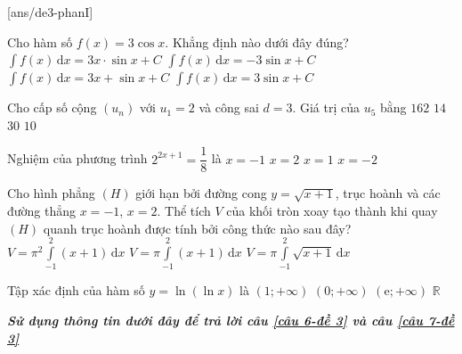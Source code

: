 \begin{name}
	{\tenchude}
	{\tendethi}
	{\tentruong}
	{\thoigian}
	\end{name}
\TN
{}[ans/de3-phanI]
\begin{ex}%
	Cho hàm số $f(x)=3\cos x$. Khẳng định nào dưới đây đúng?
	\choice
	{$\displaystyle\int f(x) \mathrm{\,d}x=3x\cdot\sin x+C$}
	{$\displaystyle\int f(x) \mathrm{\,d}x=-3\sin x+C$}
	{$\displaystyle\int f(x) \mathrm{\,d}x=3x+\sin x+C$}
	{\True $\displaystyle\int f(x) \mathrm{\,d}x=3\sin x+C$}
\end{ex}
\begin{ex}%
	Cho cấp số cộng $(u_n)$ với $u_1=2$ và công sai $d=3$. Giá trị của $u_5$ bằng
	\choice
	{$162$}
	{\True $14$}
	{$30$}
	{$10$}
\end{ex}
\begin{ex}%
	Nghiệm của phương trình $2^{2x+1}=\dfrac{1}{8}$ là
	\choice
	{$x=-1$}
	{$x=2$}
	{$x=1$}
	{\True $x=-2$}
\end{ex}
\begin{ex}%
	Cho hình phẳng $(H)$ giới hạn bởi đường cong $y=\sqrt{x+1}$, trục hoành và các đường thẳng $x=-1$, $x=2$. Thể tích $V$ của khối tròn xoay tạo thành khi quay $(H)$ quanh trục hoành được tính bởi công thức nào sau đây?
	{$V=\pi^2\displaystyle\int\limits_{-1}^{2} (x+1) \mathrm{\,d}x$}
	{\True $V=\pi\displaystyle\int\limits_{-1}^{2} (x+1) \mathrm{\,d}x$}
	{$V=\pi\displaystyle\int\limits_{-1}^{2} \sqrt{x+1} \mathrm{\,d}x$}
\end{ex}
\begin{ex}%
	Tập xác định của hàm số $y=\ln(\ln x)$ là
	\choice
	{\True $(1;+\infty)$}
	{$(0;+\infty)$}
	{$(\mathrm{e};+\infty)$}
	{$\mathbb{R}$}
\end{ex}
\textbf{\textit{Sử dụng thông tin dưới đây để trả lời câu \ref{câu 6-đề 3} và câu \ref{câu 7-đề 3}}}\\[0.5em]
